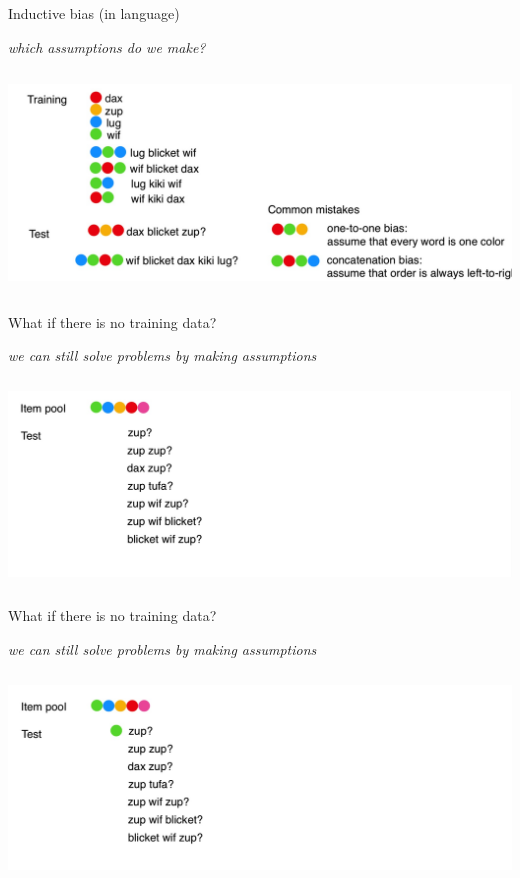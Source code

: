 \begin{frame}{Inductive bias (in language)}
\centerline{\textit{which assumptions do we make?}}
\centering\includegraphics[height=5.9cm]{image/img190839.jpg}

\end{frame}

\begin{frame}{What if there is no training data?}
\centerline{\textit{we can still solve problems by making assumptions}}
\centering\includegraphics[height=5.5cm]{image/img191412.jpg}

\end{frame}

\begin{frame}{What if there is no training data?}
\centerline{\textit{we can still solve problems by making assumptions}}
\centering\includegraphics[height=5.5cm]{image/img191823.jpg}

\end{frame}


